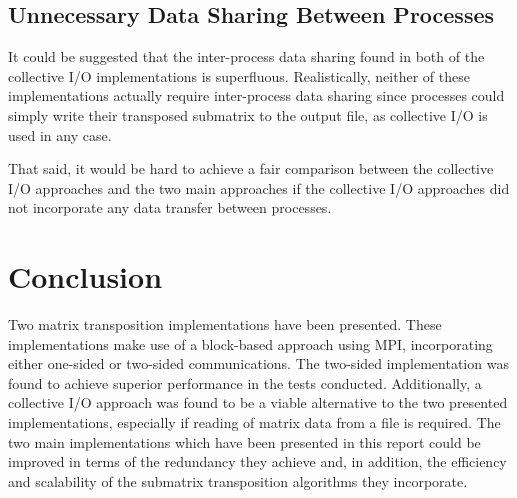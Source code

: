 \documentclass[journal,10pt,a4paper]{IEEEtran}
\begin{document}
\subsection{Unnecessary Data Sharing Between Processes}
It could be suggested that the inter-process data sharing found in both of the collective I/O implementations is superfluous. Realistically, neither of these implementations actually require inter-process data sharing since processes could simply write their transposed submatrix to the output file, as collective I/O is used in any case. 

That said, it would be hard to achieve a fair comparison between the collective I/O approaches and the two main approaches if the collective I/O approaches did not incorporate any data transfer between processes.




\section{Conclusion}
Two matrix transposition implementations have been presented. These implementations make use of a block-based approach using MPI, incorporating either one-sided or two-sided communications. The two-sided implementation was found to achieve superior performance in the tests conducted. Additionally, a collective I/O approach was found to be a viable alternative to the two presented implementations, especially if reading of matrix data from a file is required. The two main implementations which have been presented in this report could be improved in terms of the redundancy they achieve and, in addition, the efficiency and scalability of the submatrix transposition algorithms they incorporate.


\clearpage
\onecolumn

\printbibliography





\ifCLASSOPTIONcaptionsoff
  \newpage
\fi





%
%
%
\end{document}
